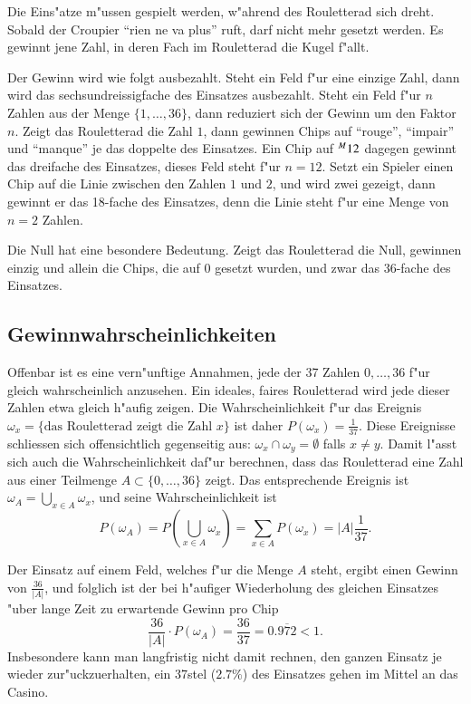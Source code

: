 Die Eins"atze m"ussen gespielt werden, w"ahrend
des Rouletterad sich dreht. Sobald der Croupier ``rien ne va plus'' ruft,
darf nicht mehr gesetzt werden. Es gewinnt jene Zahl, in deren Fach
im Rouletterad die Kugel f"allt.

Der Gewinn wird wie folgt ausbezahlt. Steht ein Feld f"ur eine einzige
Zahl, dann wird das sechsundreissigfache des Einsatzes ausbezahlt.
Steht ein Feld f"ur $n$ Zahlen aus der Menge $\{1,\dots,36\}$, dann
reduziert sich der Gewinn um den Faktor $n$. Zeigt das Rouletterad
die Zahl $1$, dann gewinnen Chips auf ``rouge'', ``impair'' und ``manque''
je das doppelte des Einsatzes. Ein Chip auf $\mathstrut^M 12$ dagegen
gewinnt das dreifache des Einsatzes, dieses Feld steht f"ur $n=12$.
Setzt ein Spieler einen Chip auf die Linie zwischen den Zahlen $1$ und
$2$, und wird zwei gezeigt, dann gewinnt er das 18-fache des Einsatzes,
denn die Linie steht f"ur eine Menge von $n=2$ Zahlen.

Die Null hat eine besondere Bedeutung. Zeigt das Rouletterad die
Null, gewinnen einzig und allein die Chips, die auf 0 gesetzt wurden,
und zwar das 36-fache des Einsatzes.

\subsection{Gewinnwahrscheinlichkeiten}
Offenbar ist es eine vern"unftige Annahmen, jede der 37 Zahlen $0,\dots,36$
f"ur gleich wahrscheinlich anzusehen. Ein ideales, faires Rouletterad
wird jede dieser Zahlen etwa gleich h"aufig zeigen. Die Wahrscheinlichkeit
f"ur das Ereignis
$\omega_x=\{\text{das Rouletterad zeigt die Zahl $x$}\}$
ist daher 
$P(\omega_x)=\frac{1}{37}.$
Diese Ereignisse schliessen sich offensichtlich gegenseitig aus:
$\omega_x\cap\omega_y=\emptyset$ falls $x\ne y$. Damit l"asst sich auch
die Wahrscheinlichkeit daf"ur berechnen, dass das Rouletterad eine
Zahl aus einer Teilmenge $A\subset\{0,\dots,36\}$ zeigt. Das entsprechende
Ereignis ist $\omega_A=\bigcup_{x\in A}\omega_x$,
und seine Wahrscheinlichkeit ist
\[
P(\omega_A)=P(\bigcup_{x\in A}\omega_x)=\sum_{x\in A}P(\omega_x)=|A|\frac1{37}.
\]

Der Einsatz auf einem Feld, welches f"ur die Menge $A$ steht, ergibt
einen Gewinn von $\frac{36}{|A|}$, und folglich ist der bei h"aufiger
Wiederholung des gleichen Einsatzes "uber lange Zeit zu erwartende Gewinn
pro Chip
\[
\frac{36}{|A|}\cdot P(\omega_A)=\frac{36}{37}=0.\overline{972}<1.
\]
Insbesondere kann man langfristig nicht damit rechnen, den ganzen
Einsatz je wieder zur"uckzuerhalten, ein 37stel ($2.7\%$) des Einsatzes gehen
im Mittel an das Casino.


